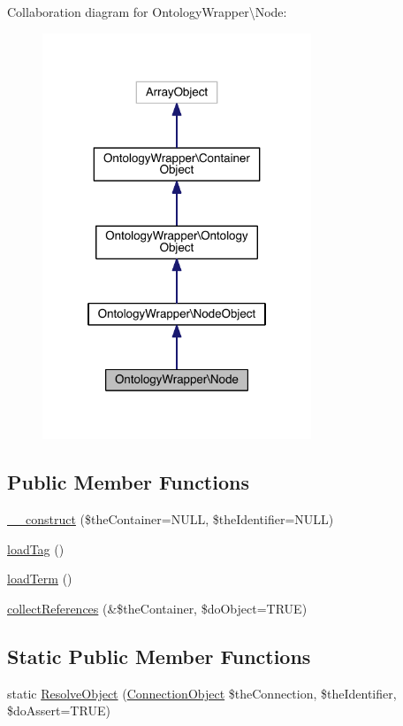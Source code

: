 Collaboration diagram for Ontology\-Wrapper\textbackslash{}Node\-:\nopagebreak
\begin{figure}[H]
\begin{center}
\leavevmode
\includegraphics[width=228pt]{class_ontology_wrapper_1_1_node__coll__graph}
\end{center}
\end{figure}
\subsection*{Public Member Functions}
\begin{DoxyCompactItemize}
\item 
\hyperlink{class_ontology_wrapper_1_1_node_aa17f2c63c36277160e883deeb0b96134}{\-\_\-\-\_\-construct} (\$the\-Container=N\-U\-L\-L, \$the\-Identifier=N\-U\-L\-L)
\item 
\hyperlink{class_ontology_wrapper_1_1_node_ab1a39673329171326b6595d0c4cb782a}{load\-Tag} ()
\item 
\hyperlink{class_ontology_wrapper_1_1_node_a672ee5306bf9cb8c8c200f51a72e23e3}{load\-Term} ()
\item 
\hyperlink{class_ontology_wrapper_1_1_node_a01c318740fadbbb79d21513495e2b16a}{collect\-References} (\&\$the\-Container, \$do\-Object=T\-R\-U\-E)
\end{DoxyCompactItemize}
\subsection*{Static Public Member Functions}
\begin{DoxyCompactItemize}
\item 
static \hyperlink{class_ontology_wrapper_1_1_node_acd916b0222274569525e2a150a71b7dc}{Resolve\-Object} (\hyperlink{class_ontology_wrapper_1_1_connection_object}{Connection\-Object} \$the\-Connection, \$the\-Identifier, \$do\-Assert=T\-R\-U\-E)
\end{DoxyCompactItemize}

